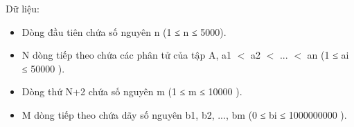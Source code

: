 Dữ liệu:  
\begin{itemize}
	\item     Dòng đầu tiên chứa số nguyên n (1 ≤ n ≤ 5000).   
	\item     N dòng tiếp theo chứa các phân tử của tập A, a1 $<$ a2 $<$ ... $<$ an  (1  ≤ ai  ≤ 50000 ).   
	\item     Dòng thứ N+2 chứa số nguyên m (1 ≤ m ≤ 10000 ).   
	\item     M dòng tiếp theo chứa dãy số nguyên b1, b2, ..., bm (0 ≤ bi ≤ 1000000000 ).   
\end{itemize}